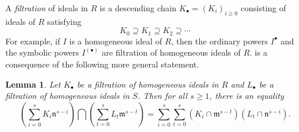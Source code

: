 \documentclass{amsart}
\newcommand{\mm}{\mathfrak{m}}
\newcommand{\nn}{\mathfrak{n}}
\theoremstyle{plain}
\newtheorem{lem}[thm]{Lemma}
\theoremstyle{definition}
\numberwithin{equation}{section}
\begin{document}
A \emph{filtration} of ideals in $R$ is a descending chain $K_\bullet=(K_i)_{i\ge 0}$ consisting of ideals of $R$ satisfying
\[
K_0 \supseteq K_1 \supseteq K_2 \supseteq \cdots 
\]
For example, if $I$ is a homogeneous ideal of $R$, then the ordinary powers $I^\bullet$ and the symbolic powers $I^{(\bullet)}$ are filtration of homogeneous ideals of $R$.  is a consequence of the following more general statement.
\begin{lem}
\label{lem_intersect_formula}
Let $K_\bullet$ be a filtration of homogeneous ideals in $R$ and $L_\bullet$ be a filtration of homogeneous ideals in $S$. Then for all $s\ge 1$, there is an equality
\begin{equation}
\label{eq_decompose_intersect}
\left(\sum_{i=0}^s K_i\nn^{s-i}\right) \bigcap \left(\sum_{t=0}^s L_t\mm^{s-t}\right) =\sum_{i=0}^s\sum_{t=0}^s (K_i\cap \mm^{s-t})(L_t\cap \nn^{s-i}).
\end{equation}
\end{lem}
\end{document}
